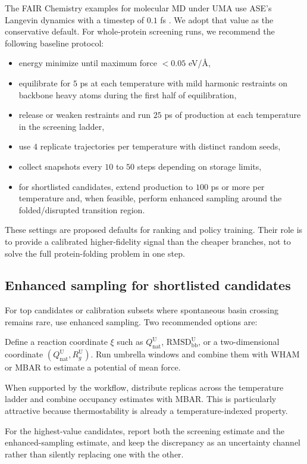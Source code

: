 \documentclass[11pt]{article}
\newcommand{\angstrom}{\ensuremath{\text{\AA}}}
\begin{document}
The FAIR Chemistry examples for molecular MD under UMA use ASE's Langevin dynamics with a timestep of $0.1$ fs \citep{fairchem2025github}. We adopt that value as the conservative default. For whole-protein screening runs, we recommend the following baseline protocol:
\begin{itemize}[leftmargin=1.5em]
    \item energy minimize until maximum force $<0.05$ eV/\angstrom,
    \item equilibrate for $5$ ps at each temperature with mild harmonic restraints on backbone heavy atoms during the first half of equilibration,
    \item release or weaken restraints and run $25$ ps of production at each temperature in the screening ladder,
    \item use $4$ replicate trajectories per temperature with distinct random seeds,
    \item collect snapshots every $10$ to $50$ steps depending on storage limits,
    \item for shortlisted candidates, extend production to $100$ ps or more per temperature and, when feasible, perform enhanced sampling around the folded/disrupted transition region.
\end{itemize}
These settings are proposed defaults for ranking and policy training. Their role is to provide a calibrated higher-fidelity signal than the cheaper branches, not to solve the full protein-folding problem in one step.

\subsection{Enhanced sampling for shortlisted candidates}

For top candidates or calibration subsets where spontaneous basin crossing remains rare, use enhanced sampling. Two recommended options are:
\begin{description}[leftmargin=1.5em,style=nextline]
    \item[Umbrella sampling.] Define a reaction coordinate $\xi$ such as $Q_{\mathrm{nat}}^{\mathrm U}$, $\mathrm{RMSD}_{\mathrm{bb}}^{\mathrm U}$, or a two-dimensional coordinate $(Q_{\mathrm{nat}}^{\mathrm U},R_g^{\mathrm U})$. Run umbrella windows and combine them with WHAM or MBAR to estimate a potential of mean force.
    \item[Temperature exchange or stratified replicas.] When supported by the workflow, distribute replicas across the temperature ladder and combine occupancy estimates with MBAR. This is particularly attractive because thermostability is already a temperature-indexed property.
\end{description}
For the highest-value candidates, report both the screening estimate and the enhanced-sampling estimate, and keep the discrepancy as an uncertainty channel rather than silently replacing one with the other.
\end{document}
